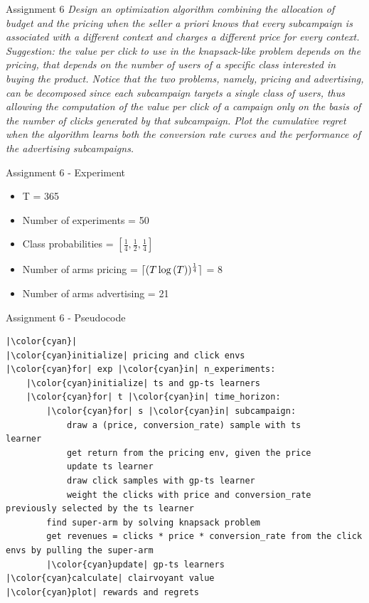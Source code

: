 \documentclass[11pt]{beamer}
\DeclarePairedDelimiter{\ceil}{\lceil}{\rceil}
\begin{document}
\begin{frame}{Assignment 6}
\textit{Design an optimization algorithm combining the allocation of budget and the pricing when the seller a priori knows that every subcampaign is associated with a different context and charges a different price for every context. Suggestion: the value per click to use in the knapsack-like problem depends on the pricing, that depends on the number of users of a specific class interested in buying the product. Notice that the two problems, namely, pricing and advertising, can be decomposed since each subcampaign targets a single class of users, thus allowing the computation of the value per click of a campaign only on the basis of the number of clicks generated by that subcampaign. Plot the cumulative regret when the algorithm learns both the conversion rate curves and the performance of the advertising subcampaigns.}
\end{frame}

\begin{frame}{Assignment 6 - Experiment}
\begin{itemize}
\item T = 365
\item Number of experiments = 50
\item Class probabilities = \( \left[ \frac{1}{4}, \frac{1}{2}, \frac{1}{4} \right] \)
\item Number of arms pricing = $\ceil{(T \log{(T)})^{\frac{1}{4}}}$ = 8
\item Number of arms advertising = 21
\end{itemize}
\end{frame}

\begin{frame}[fragile]{Assignment 6 - Pseudocode}
\begin{lstlisting}
|\color{cyan}|
|\color{cyan}initialize| pricing and click envs
|\color{cyan}for| exp |\color{cyan}in| n_experiments:
	|\color{cyan}initialize| ts and gp-ts learners 
	|\color{cyan}for| t |\color{cyan}in| time_horizon:
		|\color{cyan}for| s |\color{cyan}in| subcampaign:
			draw a (price, conversion_rate) sample with ts		learner
			get return from the pricing env, given the price
			update ts learner
			draw click samples with gp-ts learner
			weight the clicks with price and conversion_rate	previously selected by the ts learner
		find super-arm by solving knapsack problem
		get revenues = clicks * price * conversion_rate from the click envs by pulling the super-arm
		|\color{cyan}update| gp-ts learners 
|\color{cyan}calculate| clairvoyant value
|\color{cyan}plot| rewards and regrets
\end{lstlisting}
\end{frame}
\end{document}
